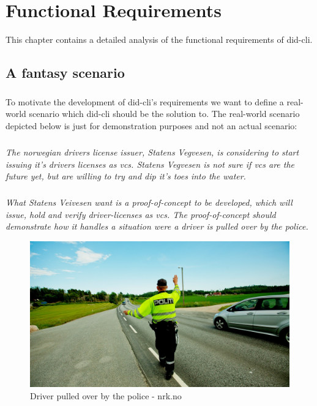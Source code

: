 \chapter{Functional Requirements}

This chapter contains a detailed analysis of the functional requirements of \acrshort{did-cli}.

\section{A fantasy scenario}

\paragraph{}
To motivate the development of \acrshort{did-cli}'s requirements we want to define a real-world scenario which \acrshort{did-cli} should be the solution to. The real-world scenario depicted below is just for demonstration purposes and not an actual scenario:

\paragraph{}
\textit{The norwegian drivers license issuer, Statens Vegvesen, is considering to start issuing it's drivers licenses as \acrfull{vc}s. Statens Vegvesen is not sure if \acrshort{vc}s are the future yet, but are willing to try and dip it's toes into the water.}

\paragraph{}
\textit{What Statens Veivesen want is a proof-of-concept to be developed, which will issue, hold and verify driver-licenses as \acrfull{vc}s. The proof-of-concept should demonstrate how it handles a situation were a driver is pulled over by the police.}


    \begin{figure}[htbp]
      \centering
      \includegraphics[width=.65\textwidth]{figures/politikontrollnrk.jpg}
      \caption[]{Driver pulled over by the police - nrk.no}
    \end{figure}




